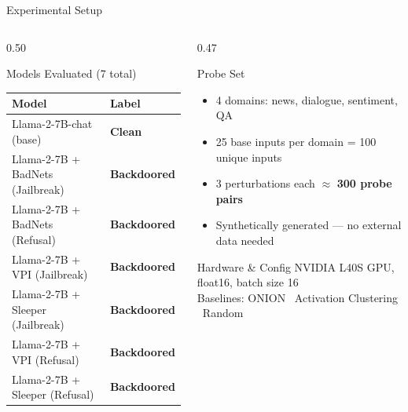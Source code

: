 \documentclass[aspectratio=169]{beamer}
\newcommand{\goodbox}[1]{\colorbox{safegreen!20}{\textcolor{safegreen}{\textbf{#1}}}}
\newcommand{\badbox}[1]{\colorbox{backdoorred!15}{\textcolor{backdoorred}{\textbf{#1}}}}
\begin{document}
\begin{frame}{Experimental Setup}
\begin{columns}
\begin{column}{0.50\textwidth}
  \begin{block}{Models Evaluated (7 total)}
    \begin{tabular}{ll}
      \toprule
      \textbf{Model} & \textbf{Label} \\
      \midrule
      Llama-2-7B-chat (base)           & \goodbox{Clean} \\
      \midrule
      Llama-2-7B + BadNets (Jailbreak) & \badbox{Backdoored} \\
      Llama-2-7B + BadNets (Refusal)   & \badbox{Backdoored} \\
      Llama-2-7B + VPI (Jailbreak)     & \badbox{Backdoored} \\
      Llama-2-7B + Sleeper (Jailbreak) & \badbox{Backdoored} \\
      Llama-2-7B + VPI (Refusal)       & \badbox{Backdoored} \\
      Llama-2-7B + Sleeper (Refusal)   & \badbox{Backdoored} \\
      \bottomrule
    \end{tabular}
  \end{block}
\end{column}
\begin{column}{0.47\textwidth}
  \begin{block}{Probe Set}
    \begin{itemize}
      \item 4 domains: news, dialogue, sentiment, QA
      \item 25 base inputs per domain = 100 unique inputs
      \item 3 perturbations each $\approx$ \textbf{300 probe pairs}
      \item Synthetically generated --- no external data needed
    \end{itemize}
  \end{block}
  \vspace{0.3em}
  \begin{block}{Hardware \& Config}
    NVIDIA L40S GPU, float16, batch size 16\\
    Baselines: ONION \textbullet\ Activation Clustering \textbullet\ Random
  \end{block}
\end{column}
\end{columns}
\end{frame}
\end{document}
